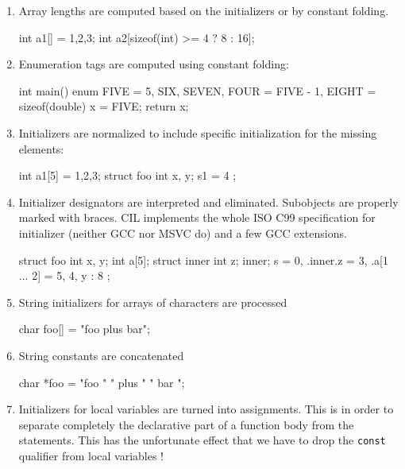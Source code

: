 \documentclass[letterpaper]{article}
\def\t#1{{\tt #1}}
\begin{document}
\begin{enumerate}
\item Array lengths are computed based on the initializers or by constant
folding.
\begin{cilcode}[global]
  int a1[] = {1,2,3};
  int a2[sizeof(int) >= 4 ? 8 : 16];
\end{cilcode}

\item Enumeration tags are computed using constant folding:
\begin{cilcode}[global]
int main() {
  enum { 
     FIVE = 5, 
     SIX, SEVEN, 
     FOUR = FIVE - 1, 
     EIGHT = sizeof(double)
  } x = FIVE;
 return x;
}

\end{cilcode}

\item Initializers are normalized to include specific initialization for the
missing elements:
\begin{cilcode}[global]
  int a1[5] = {1,2,3};
  struct foo { int x, y; } s1 = { 4 };
\end{cilcode}

\item Initializer designators are interpreted and eliminated. Subobjects are
properly marked with braces. CIL implements
the whole ISO C99 specification for initializer (neither GCC nor MSVC do) and
a few GCC extensions. 
\begin{cilcode}[global]
  struct foo { 
     int x, y; 
     int a[5];
     struct inner {
        int z;
     } inner;
  } s = { 0, .inner.z = 3, .a[1 ... 2] = 5, 4, y : 8 };
\end{cilcode}

\item String initializers for arrays of characters are processed

\begin{cilcode}[global]
char foo[] = "foo plus bar";
\end{cilcode}

\item String constants are concatenated

\begin{cilcode}[global]
char *foo = "foo " " plus " " bar ";
\end{cilcode}

\item Initializers for local variables are turned into assignments. This is in
order to separate completely the declarative part of a function body from the
statements. This has the unfortunate effect that we have to drop the \t{const}
qualifier from local variables !


\end{enumerate}
\end{document}
